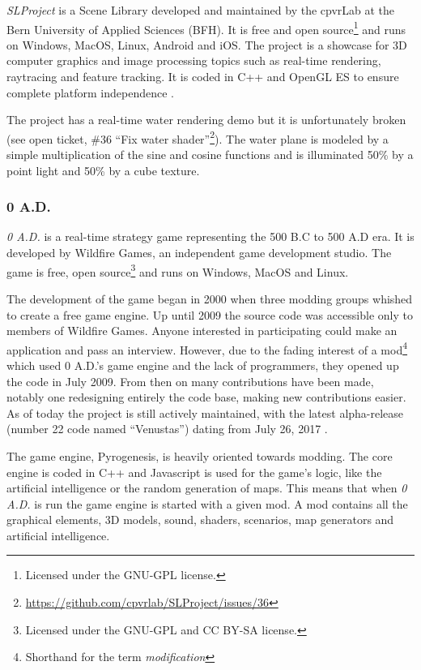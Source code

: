 \textit{SLProject} is a Scene Library developed and maintained by the cpvrLab at
the Bern University of Applied Sciences (BFH). It is free and open
source\footnote{Licensed under the GNU-GPL license.} and runs on Windows, MacOS,
Linux, Android and iOS\@. The project is a showcase for 3D computer graphics and
image processing topics such as real-time rendering, raytracing and feature
tracking. It is coded in C++ and OpenGL ES to ensure complete platform
independence \autocite{hudritch2017slproject, slproject2017doxygen}.

The project has a real-time water rendering demo but it is unfortunately broken
(see open ticket, \#36 ``Fix water
shader''\footnote{\url{https://github.com/cpvrlab/SLProject/issues/36}}). The
water plane is modeled by a simple multiplication of the sine and cosine
functions and is illuminated 50\% by a point light and 50\% by a cube texture.


\subsubsection{0 A.D.}

\textit{0 A.D.} is a real-time strategy game representing the 500 B.C to 500 A.D
era. It is developed by Wildfire Games, an independent game development studio.
The game is free, open source\footnote{Licensed under the GNU-GPL and CC BY-SA
license.} and runs on Windows, MacOS and Linux.

The development of the game began in 2000 when three modding groups whished to
create a free game engine. Up until 2009 the source code was accessible only to
members of Wildfire Games. Anyone interested in participating could make an
application and pass an interview. However, due to the fading interest of a
mod\footnote{Shorthand for the term \textit{modification}} which used 0 A.D.'s
game engine and the lack of programmers, they opened up the code in July 2009.
From then on many contributions have been made, notably one redesigning entirely
the code base, making new contributions easier. As of today the project is still
actively maintained, with the latest alpha-release (number 22 code named
``Venustas'') dating from July 26,
2017 \autocite{wildfire0adproject,wildfire0adstory}.

The game engine, Pyrogenesis, is heavily oriented towards modding. The core
engine is coded in C++ and Javascript is used for the game's logic, like the
artificial intelligence or the random generation of maps. This means that when
\textit{0 A.D.} is run the game engine is started with a given mod. A mod
contains all the graphical elements, 3D models, sound, shaders, scenarios, map
generators and artificial intelligence.

